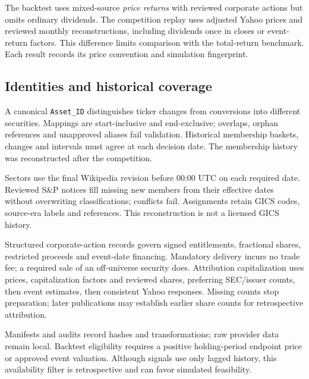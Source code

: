 The backtest uses mixed-source \emph{price returns} with reviewed corporate
actions but omits ordinary dividends. The competition replay uses adjusted
Yahoo prices and reviewed monthly reconstructions, including dividends once
in closes or event-return factors. This difference limits comparison with the
total-return benchmark. Each result records its price convention and
simulation fingerprint.

\subsection{Identities and historical coverage}

A canonical \texttt{Asset\_ID} distinguishes ticker changes from conversions
into different securities. Mappings are start-inclusive and end-exclusive;
overlaps, orphan references and unapproved aliases fail validation. Historical
membership baskets, changes and intervals must agree at each decision date.
The membership history was reconstructed after the competition.

Sectors use the final Wikipedia revision before 00:00 UTC on each required
date. Reviewed S\&P notices fill missing new members from their effective dates
without overwriting classifications; conflicts fail. Assignments retain GICS
codes, source-era labels and references. This reconstruction is not a licensed
GICS history.

Structured corporate-action records govern signed entitlements, fractional
shares, restricted proceeds and event-date financing. Mandatory delivery
incurs no trade fee; a required sale of an off-universe security does.
Attribution capitalization uses prices, capitalization factors and reviewed
shares, preferring SEC/issuer counts, then event estimates, then consistent
Yahoo responses. Missing counts stop preparation; later publications may
establish earlier share counts for retrospective attribution.

Manifests and audits record hashes and transformations; raw provider data
remain local. Backtest eligibility requires a positive holding-period endpoint
price or approved event valuation. Although signals use only lagged history,
this availability filter is retrospective and can favor simulated
feasibility.
